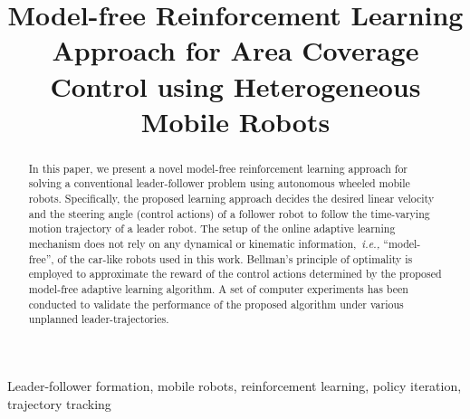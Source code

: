 \documentclass[conference]{IEEEtran}
\begin{document}
\title{Model-free Reinforcement Learning Approach for Area Coverage Control using Heterogeneous Mobile Robots %
%  
}

\author{%
%
}

\maketitle

\begin{abstract}
In this paper, we present a novel model-free reinforcement learning approach for solving a conventional leader-follower problem using autonomous wheeled mobile robots. Specifically, the proposed learning approach decides the desired linear velocity and the steering angle (control actions) of a follower robot to follow the time-varying motion trajectory of
a leader robot. The setup of the online adaptive learning mechanism does not rely on any dynamical or kinematic information,~\textit{i.e.,} ``model-free'', of the car-like robots used in this work. Bellman's principle of optimality is employed to approximate the reward of the control actions determined by the proposed model-free adaptive learning algorithm. A set of computer experiments has been conducted to validate the performance of the proposed algorithm under various unplanned leader-trajectories. 
%
\end{abstract}

\begin{IEEEkeywords}
Leader-follower formation, mobile robots, reinforcement learning, policy iteration, trajectory tracking
\end{IEEEkeywords}
\end{document}
